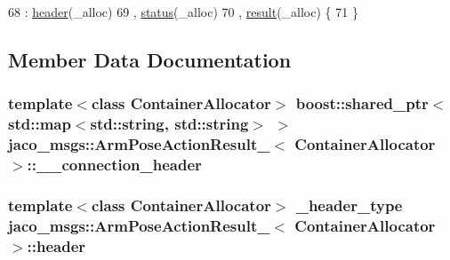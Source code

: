 \begin{DoxyCode}
68     : \hyperlink{structjaco__msgs_1_1ArmPoseActionResult___ad9fc777cd6615aa01e98c2c463ea8cfe}{header}(\_alloc)
69     , \hyperlink{structjaco__msgs_1_1ArmPoseActionResult___a8c41477e86f3e0e82044b11667eb0e8f}{status}(\_alloc)
70     , \hyperlink{structjaco__msgs_1_1ArmPoseActionResult___a9bb1ef2f47899c230eaa740ee2df5b09}{result}(\_alloc)  \{
71     \}
\end{DoxyCode}


\subsection{Member Data Documentation}
\subsubsection[{\texorpdfstring{\+\_\+\+\_\+connection\+\_\+header}{__connection_header}}]{\setlength{\rightskip}{0pt plus 5cm}template$<$class Container\+Allocator$>$ boost\+::shared\+\_\+ptr$<$std\+::map$<$std\+::string, std\+::string$>$ $>$ {\bf jaco\+\_\+msgs\+::\+Arm\+Pose\+Action\+Result\+\_\+}$<$ Container\+Allocator $>$\+::\+\_\+\+\_\+connection\+\_\+header}\hypertarget{structjaco__msgs_1_1ArmPoseActionResult___a35cba65bda3cd4103d00946921588c46}{}\label{structjaco__msgs_1_1ArmPoseActionResult___a35cba65bda3cd4103d00946921588c46}
\subsubsection[{\texorpdfstring{header}{header}}]{\setlength{\rightskip}{0pt plus 5cm}template$<$class Container\+Allocator$>$ {\bf \+\_\+header\+\_\+type} {\bf jaco\+\_\+msgs\+::\+Arm\+Pose\+Action\+Result\+\_\+}$<$ Container\+Allocator $>$\+::header}\hypertarget{structjaco__msgs_1_1ArmPoseActionResult___ad9fc777cd6615aa01e98c2c463ea8cfe}{}\label{structjaco__msgs_1_1ArmPoseActionResult___ad9fc777cd6615aa01e98c2c463ea8cfe}
